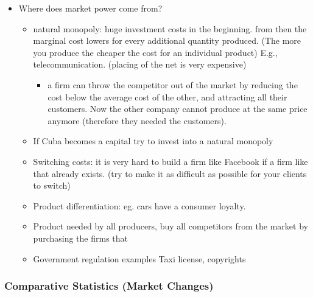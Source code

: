 \documentclass[12pt, a4paper, titlepage]{extarticle}
\begin{document}
	\begin{itemize}
	\item Where does market power come from?
    	\begin{itemize}
    	\item natural monopoly: huge investment costs in the beginning. from then the marginal cost lowers for every additional quantity produced. (The more you produce the cheaper the cost for an individual product) E.g., telecommunication. (placing of the net is very expensive) 
        	\begin{itemize}
        	\item a firm can throw the competitor out of the market by reducing the cost below the average cost of the other, and attracting all their customers. Now the other company cannot produce at the same price anymore (therefore they needed the customers).
        	\end{itemize}
    	\item If Cuba becomes a capital try to invest into a natural monopoly
    	\item Switching costs: it is very hard to build a firm like Facebook if a firm like that already exists. (try to make it as difficult as possible for your clients to switch)
    	\item Product differentiation: eg. cars have a consumer loyalty.
    	\item Product needed by all producers, buy all competitors from the market by purchasing the firms that 
    	\item Government regulation examples Taxi license, copyrights
    	\end{itemize}
    \end{itemize}
	
	\subsubsection{Comparative Statistics (Market Changes)}
	
\end{document}
